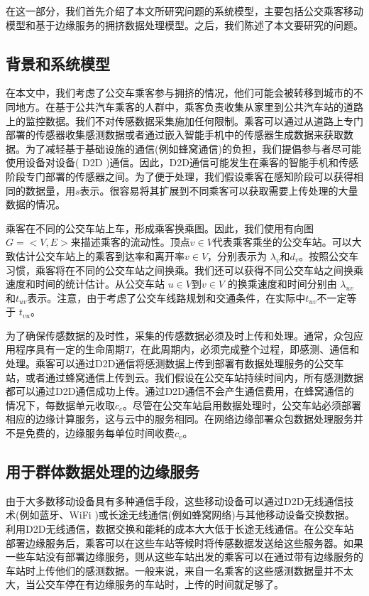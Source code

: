 在这一部分，我们首先介绍了本文所研究问题的系统模型，主要包括公交乘客移动模型和基于边缘服务的拥挤数据处理模型。之后，我们陈述了本文要研究的问题。

\subsection{背景和系统模型}

在本文中，我们考虑了公交车乘客参与拥挤的情况，他们可能会被转移到城市的不同地方。在基于公共汽车乘客的人群中，乘客负责收集从家里到公共汽车站的道路上的监控数据。我们不对传感数据采集施加任何限制。乘客可以通过从道路上专门部署的传感器收集感测数据或者通过嵌入智能手机中的传感器生成数据来获取数据。为了减轻基于基础设施的通信(例如蜂窝通信)的负担，我们提倡参与者尽可能使用设备对设备( D2D )通信。因此，D2D通信可能发生在乘客的智能手机和传感阶段专门部署的传感器之间。为了便于处理，我们假设乘客在感知阶段可以获得相同的数据量，用$s$表示。很容易将其扩展到不同乘客可以获取需要上传处理的大量数据的情况。


乘客在不同的公交车站上车，形成乘客换乘图。因此，我们使用有向图$G=<V, E>$来描述乘客的流动性。顶点$v\in V$代表乘客乘坐的公交车站。可以大致估计公交车站上的乘客到达率和离开率$v\in V$，分别表示为 $\lambda_v$和$d_v$。按照公交车习惯，乘客将在不同的公交车站之间换乘。我们还可以获得不同公交车站之间换乘速度和时间的统计估计。从公交车站 $u\in V$到$v\in V$ 的换乘速度和时间分别由 $\lambda_{uv}$和$t_{uv}$表示。注意，由于考虑了公交车线路规划和交通条件，在实际中$t_{uv}$不一定等于 $t_{vu}$。

为了确保传感数据的及时性，采集的传感数据必须及时上传和处理。通常，众包应用程序具有一定的生命周期$T$，在此周期内，必须完成整个过程，即感测、通信和处理。乘客可以通过D2D通信将感测数据上传到部署有数据处理服务的公交车站，或者通过蜂窝通信上传到云。我们假设在公交车站持续时间内，所有感测数据都可以通过D2D通信成功上传。通过D2D通信不会产生通信费用，在蜂窝通信的情况下，每数据单元收取$c_c$。尽管在公交车站启用数据处理时，公交车站必须部署相应的边缘计算服务，这与云中的服务相同。在网络边缘部署众包数据处理服务并不是免费的，边缘服务每单位时间收费$c_v$。

\subsection{用于群体数据处理的边缘服务}

由于大多数移动设备具有多种通信手段，这些移动设备可以通过D2D无线通信技术(例如蓝牙、WiFi )或长途无线通信(例如蜂窝网络)与其他移动设备交换数据。利用D2D无线通信，数据交换和能耗的成本大大低于长途无线通信。在公交车站部署边缘服务后，乘客可以在这些车站等候时将传感数据发送给这些服务器。如果一些车站没有部署边缘服务，则从这些车站出发的乘客可以在通过带有边缘服务的车站时上传他们的感测数据。一般来说，来自一名乘客的这些感测数据量并不太大，当公交车停在有边缘服务的车站时，上传的时间就足够了。

